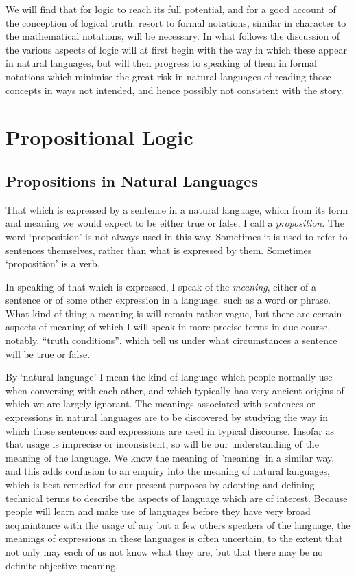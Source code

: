 \documentclass[10pt,titlepage]{article}
\begin{document}
We will find that for logic to reach its full potential, and for a good account of the conception of logical truth. resort to formal notations, similar in character to the mathematical notations, will be necessary.
In what follows the discussion of the various aspects of logic will at first begin with the way in which these appear in natural languages, but will then progress to speaking of them in formal notations which minimise the great risk in natural languages of reading those concepts in ways not intended, and hence possibly not consistent with the story.

\section{Propositional Logic}

\subsection{Propositions in Natural Languages}

That which is expressed by a sentence in a natural language, which from its form and meaning we would expect to be either true or false, I call a {\it proposition}.
The word `proposition' is not always used in this way.
Sometimes it is used to refer to sentences themselves, rather than what is expressed by them.
Sometimes `proposition' is a verb.

In speaking of that which is expressed, I speak of the \emph{meaning}, either of a sentence or of some other expression in a language. such as a word or phrase.
What kind of thing a meaning is will remain rather vague, but there are certain aspects of meaning of which I will speak in more precise terms in due course, notably, ``truth conditions'', which tell us under what circumstances a sentence will be true or false.

By `natural language' I mean the kind of language which people normally use when conversing with each other, and which typically has very ancient origins of which we are largely ignorant.
The meanings associated with sentences or expressions in natural languages are to be discovered by studying the way in which those sentences and expressions are used in typical discourse.
Insofar as that usage is imprecise or inconsistent, so will be our understanding of the meaning of the language.
We know the meaning of 'meaning' in a similar way, and this adds confusion to an enquiry into the meaning of natural languages, which is best remedied for our present purposes by adopting and defining technical terms to describe the aspects of language which are of interest.
Because people will learn and make use of languages before they have very broad acquaintance with the usage of any but a few others speakers of the language, the meanings of expressions in these languages is often uncertain, to the extent that not only may each of us not know what they are, but that there may be no definite objective meaning.
\end{document}
